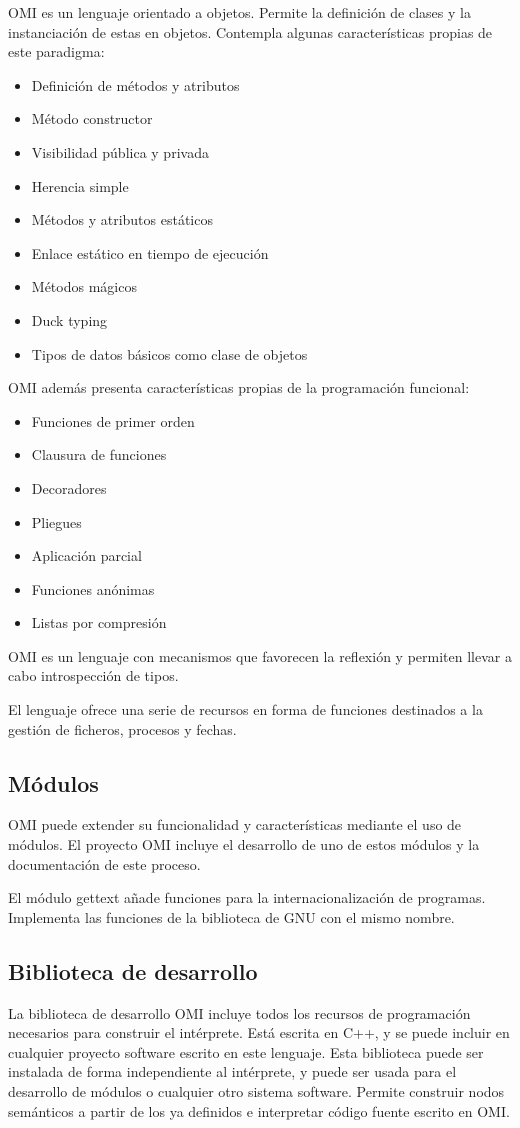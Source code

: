 OMI es un lenguaje orientado a objetos. Permite la definición de clases y la instanciación de estas en objetos. Contempla algunas características 
propias de este paradigma:
\begin{itemize}
\item Definición de métodos y atributos
\item Método constructor
\item Visibilidad pública y privada
\item Herencia simple
\item Métodos y atributos estáticos
\item Enlace estático en tiempo de ejecución
\item Métodos mágicos
\item Duck typing
\item Tipos de datos básicos como clase de objetos
\end{itemize}

OMI además presenta características propias de la programación funcional:
\begin{itemize}
\item Funciones de primer orden
\item Clausura de funciones
\item Decoradores
\item Pliegues
\item Aplicación parcial
\item Funciones anónimas
\item Listas por compresión
\end{itemize}

OMI es un lenguaje con mecanismos que favorecen la reflexión y permiten llevar a cabo introspección de tipos. 

El lenguaje ofrece una serie de recursos en forma de funciones destinados a la gestión de
ficheros, procesos y fechas.
  
\subsection{Módulos}
OMI puede extender su funcionalidad y características mediante el uso de módulos. El proyecto OMI incluye 
el desarrollo de uno de estos módulos y la documentación de este proceso.

El módulo gettext añade funciones para la internacionalización de programas. Implementa las funciones de la biblioteca de GNU
con el mismo nombre.

\subsection{Biblioteca de desarrollo}
La biblioteca de desarrollo OMI incluye todos los recursos de programación necesarios para construir el intérprete. 
Está escrita en C++, y se puede incluir en cualquier proyecto software escrito en este lenguaje. 
Esta biblioteca puede ser instalada de forma independiente al intérprete, y puede ser usada para el desarrollo de 
módulos o cualquier otro sistema software. Permite construir nodos semánticos a partir de los ya definidos e 
interpretar código fuente escrito en OMI.

